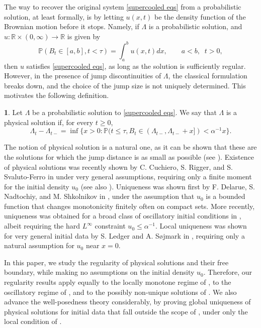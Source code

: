 \documentclass{article}
\numberwithin{equation}{section}
\numberwithin{figure}{section}
\theoremstyle{plain}
\theoremstyle{plain}
\theoremstyle{plain}
\theoremstyle{plain}
\theoremstyle{definition}
\newtheorem{defn}[thm]{\protect\definitionname}
\theoremstyle{remark}
\def\R{{\mathbb{R}}}
\def\P{{\mathbb{P}}}
\providecommand{\definitionname}{Definition}
\begin{document}
The way to recover the original system \eqref{supercooled eqs} from a probabilistic solution, at least formally, is by letting $u(x,t)$ be the density function of the Brownian motion before it stops. Namely, if $\Lambda$ is a probabilistic solution, and $u:\R \times (0,\infty) \to \R$ is given by
\begin{equation} \label{u defi}    \P(B_t\in [a,b], t<\tau)=\int_{a}^bu(x,t)dx,\quad \quad a<b,\; \;t>0,
\end{equation}
then $u$ satisfies \eqref{supercooled eqs}, as long as the solution is sufficiently regular. However, in the presence of jump discontinuities of $\Lambda$, the classical formulation breaks down, and the choice of the jump size is not uniquely determined. This motivates the following definition.
\begin{defn} \label{def: physical} Let $\Lambda$ be a probabilistic solution to \eqref{supercooled eqs}. We say that $\Lambda$ is a physical solution if, for every $t\geq 0$,
\begin{equation} \label{eq: physical defi}
\Lambda_{t}-\Lambda_{t-}=\inf\{x>0: \P(t \leq \tau, B_{t}\in (\Lambda_{t-},\Lambda_{t-}+x])<\alpha^{-1}x\}.
\end{equation}
\end{defn}
The notion of physical solution is a natural one, as it can be shown that these are the solutions for which the jump distance is as small as possible (see \cite[Prop. 1.2]{hambly}). Existence of physical solutions was recently shown by C. Cuchiero, S. Rigger, and S. Svaluto-Ferro in \cite[Thm. 6.5]{CRF} under very general assumptions, requiring only a finite moment for the initial density $u_0$ (see also \cite{DelIngRubTan,NadShk,NadShk2}). Uniqueness was shown first by F. Delarue, S. Nadtochiy, and M. Shkolnikov in \cite[Thm. 1.1]{delarue}, under the assumption that $u_0$ is a bounded function that changes monotonicity finitely often on compact sets. More recently, uniqueness was obtained for a broad class of oscillatory initial conditions in \cite[Thm. 1.1]{shkolnikov}, albeit requiring the hard $L^{\infty}$ constraint $u_0\leq \alpha^{-1}$. Local uniqueness was shown for very general initial data by S. Ledger and A. S\o jmark in \cite[Thm. 3.1]{LedSoj}, requiring only a natural assumption for $u_0$ near $x=0$.

In this paper, we study the regularity of physical solutions and their free boundary, while making no assumptions on the initial density $u_0$. Therefore, our regularity results apply equally to the locally monotone regime of \cite{delarue}, to the oscillatory regime of \cite{shkolnikov}, and to the possibly non-unique solutions of \cite{CRF}. We also advance the well-posedness theory considerably, by proving global uniqueness of physical solutions for initial data that fall outside the scope of \cite{delarue,shkolnikov}, under only the local condition of \cite[Thm. 3.1]{LedSoj}.
\end{document}

